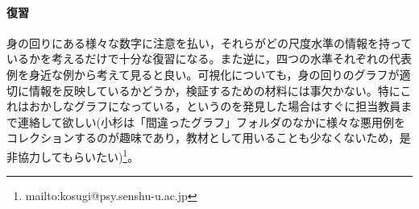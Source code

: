 \paragraph{復習}
身の回りにある様々な数字に注意を払い，それらがどの尺度水準の情報を持っているかを考えるだけで十分な復習になる。また逆に，四つの水準それぞれの代表例を身近な例から考えて見ると良い。可視化についても，身の回りのグラフが適切に情報を反映しているかどうか，検証するための材料には事欠かない。特にこれはおかしなグラフになっている，というのを発見した場合はすぐに担当教員まで連絡して欲しい(小杉は「間違ったグラフ」フォルダのなかに様々な悪用例をコレクションするのが趣味であり，教材として用いることも少なくないため，是非協力してもらいたい)\footnote{mailto:kosugi@psy.senshu-u.ac.jp}。
